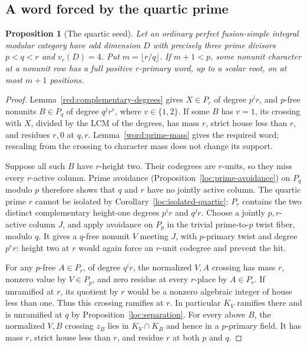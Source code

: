 \documentclass[11pt,a4paper]{article}
\numberwithin{equation}{section}
\newtheorem{proposition}[theorem]{Proposition}
\begin{document}
\subsection{A word forced by the quartic prime}

\begin{proposition}[The quartic seed]\label{supp:quartic-seed}
Let an ordinary perfect fusion-simple integral modular category
have odd dimension $D$ with precisely three prime divisors $p<q<r$
and $v_r(D)=4$.
Put $m=\lfloor r/q\rfloor$. If $m+1<p$, some nonunit
character at a nonunit row has a full positive $r$-primary word,
up to a scalar root, on at most $m+1$ positions.
\end{proposition}
\begin{proof}
Lemma~\ref{red:complementary-degrees} gives
$X\in P_r$ of degree $p^ir$, and $p$-free nonunits
$B\in P_q$ of degree $q^jr^v$, where $v\in\{1,2\}$.
If some $B$ has $v=1$, its crossing with $X$, divided by
the LCM of the degrees, has mass $r$, strict house less
than $r$, and residues $r,0$ at $q,r$.
Lemma~\ref{word:prime-mass} gives the required word; rescaling
from the crossing to character mass does not change its support.

Suppose all such $B$ have $r$-height two. Their codegrees
are $r$-units, so they miss every $r$-active column.
Prime avoidance (Proposition~\ref{loc:prime-avoidance})
on $P_q$ modulo $p$ therefore shows
that $q$ and $r$ have no jointly active column. The quartic
prime $r$ cannot be isolated by Corollary~\ref{loc:isolated-quartic}:
$P_r$ contains the two distinct complementary height-one degrees
$p^ir$ and $q^jr$. Choose a jointly $p,r$-active
column $J$, and apply avoidance on $P_p$ in the trivial
prime-to-$p$ twist fiber, modulo $q$. It gives a $q$-free
nonunit $V$ meeting $J$, with $p$-primary twist and degree
$p^er$: height two at $r$ would again force an $r$-unit
codegree and prevent the hit.

For any $p$-free $A\in P_r$, of degree $q^ir$, the
normalized $V,A$ crossing has mass $r$, nonzero value
by $V\in P_p$, and zero residue at every $r$-place by
$A\in P_r$. If unramified at $r$, its quotient by $r$
would be a nonzero algebraic integer of house less than
one. Thus this crossing ramifies at $r$. In particular
$K_V$ ramifies there and is unramified at $q$ by
Proposition~\ref{loc:separation}.
For every above $B$, the normalized $V,B$ crossing $z_B$
lies in $K_V\cap K_B$ and hence in a $p$-primary field.
It has mass $r$, strict house less than $r$, and residue
$r$ at both $p$ and $q$.


\end{proof}
\end{document}
